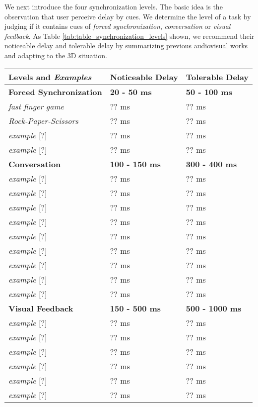 We next introduce the four synchronization levels. The basic idea is the observation that user perceive delay by cues. We determine the level of a task by judging if it contains cues of \emph{forced synchronization}, \emph{conversation} or \emph{visual feedback}. As Table \ref{tab:table_synchronization_levels} shown, we recommend their noticeable delay and tolerable delay by summarizing previous audiovisual works and adapting to the 3D situation.

\begin{table} [!htbp]
\newcommand{\tabincell}[2]{\begin{tabular}{@{}#1@{}}#2\end{tabular}}
\begin{tabular}{|p{}|p{}|p{}|}
\hline 
\textbf{Levels} and \emph{Examples} & Noticeable Delay & Tolerable Delay \\

\hline
\textbf{Forced Synchronization} & \textbf{20 - 50 ms} & \textbf{50 - 100 ms} \\
\hline
\emph{fast finger game} \cite{ishibashi2006subjective} & ?? ms & ?? ms \\
\hline
\emph{Rock-Paper-Scissors} \cite{hashimoto2006influences} & ?? ms & ?? ms \\
\hline
\emph{example} [?] & ?? ms & ?? ms \\
\hline
\emph{example} [?] & ?? ms & ?? ms \\


\hline
\textbf{Conversation} & \textbf{100 - 150 ms} & \textbf{300 - 400 ms} \\
\hline
\emph{example} [?] & ?? ms & ?? ms \\
\hline
\emph{example} [?] & ?? ms & ?? ms \\
\hline
\emph{example} [?] & ?? ms & ?? ms \\
\hline
\emph{example} [?] & ?? ms & ?? ms \\
\hline
\emph{example} [?] & ?? ms & ?? ms \\
\hline
\emph{example} [?] & ?? ms & ?? ms \\
\hline
\emph{example} [?] & ?? ms & ?? ms \\
\hline
\emph{example} [?] & ?? ms & ?? ms \\
\hline
\emph{example} [?] & ?? ms & ?? ms \\

\hline
\textbf{Visual Feedback} & \textbf{150 - 500 ms} & \textbf{500 - 1000 ms} \\
\hline
\emph{example} [?] & ?? ms & ?? ms \\
\hline
\emph{example} [?] & ?? ms & ?? ms \\
\hline
\emph{example} [?] & ?? ms & ?? ms \\
\hline
\emph{example} [?] & ?? ms & ?? ms \\
\hline
\emph{example} [?] & ?? ms & ?? ms \\
\hline
\emph{example} [?] & ?? ms & ?? ms \\


\end{tabular}
\end{table}
